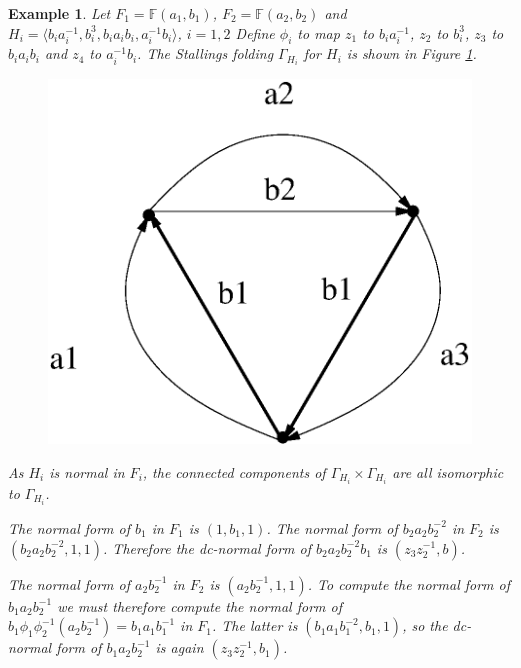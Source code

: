 \documentclass[a4paper,12pt]{article}
\newcommand{\G}{\Gamma }
\newtheorem{exam}[theorem]{Example}
\newenvironment{example}{\begin{exam} \rm}{\end{exam}}
\numberwithin{equation}{section}
\numberwithin{figure}{section}
\newcommand{\FF}{\ensuremath{\mathbb{F}}}
\newcommand{\la}{\langle}
\newcommand{\ra}{\rangle}
\begin{document}
\begin{example}\label{ex:ce}
Let $F_1=\FF( a_1,b_1)$, $F_2=\FF(a_2, b_2)$ and $H_i=\la b_ia_i^{-1}, b_i^3, 
b_ia_ib_i,
a_i^{-1}b_i\ra$, $i=1,2$
Define $\phi_i$ to map $z_1$ to $  b_ia_i^{-1}$, $z_2$ to $b_i^3$, $z_3$ to 
 $b_ia_ib_i$ and $z_4$ to $a_i^{-1}b_i$. 
The Stallings folding $\G_{H_i}$ for $H_i$ is shown in Figure \ref{fig:ce}.
\begin{figure}
\begin{center}
\includegraphics[scale=0.6]{ce.eps}
\caption{}\label{fig:ce}
\end{center}
\end{figure}
As $H_i$ is normal in $F_i$, the connected components of $\G_{H_i}\times
\G_{H_i}$ are all isomorphic to $\G_{H_i}$. 

The normal form of $b_1$ in $F_1$ is $(1,b_1,1)$. The normal form of 
$b_2a_2b_2^{-2}$ in $F_2$ is $( b_2a_2b_2^{-2}, 1, 1)$. Therefore the 
dc-normal form of $ b_2a_2b_2^{-2}b_1$  is $(z_3z_2^{-1},b)$.

The normal form of $a_2b_2^{-1}$ in $F_2$ is $(a_2b_2^{-1}, 1 ,1)$. 
To compute the normal form of $b_1a_2b_2^{-1}$ we must therefore compute
the normal form of $b_1\phi_1\phi_2^{-1}(a_2b_2^{-1})=
b_1a_1b_1^{-1}$ in $F_1$. The latter is $( b_1a_1b_1^{-2}, b_1,1)$, so
the dc-normal form of $b_1a_2b_2^{-1}$ is again $(z_3z_2^{-1} , b_1)$.
\end{example}
\end{document}
